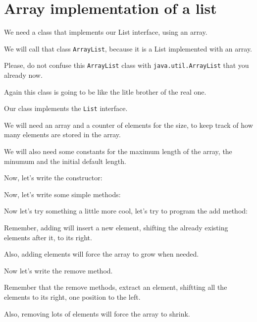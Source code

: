 \documentclass[a4paper, 9pt]{extarticle}
\begin{document}
\section{Array implementation of a list}

We need a class that implements our List interface, using an array.

We will call that class \verb+ArrayList+, because it is a List implemented with an array.

Please, do not confuse this \verb+ArrayList+ class with \verb+java.util.ArrayList+ that you already now.

Again this class is going to be like the litle brother of the real one.


Our class implements the \verb+List+ interface.

We will need an array and a counter of elements for the size, to keep track of
how many elements are stored in the array.

We will also need some constants for the maximum length of the array, the
minumum and the initial default length.

Now, let's write the constructor:


Now, let's write some simple methods:




Now let's try something a little more cool, let's try to program the add method:

Remember, adding will insert a new element, shifting the already existing elements after it, to its right.

Also, adding elements will force the array to grow when needed.




Now let's write the remove method.

Remember that the remove methods, extract an element, shiftting all the elements to its right, one position to the left.

Also, removing lots of elements will force the array to shrink.


\end{document}
